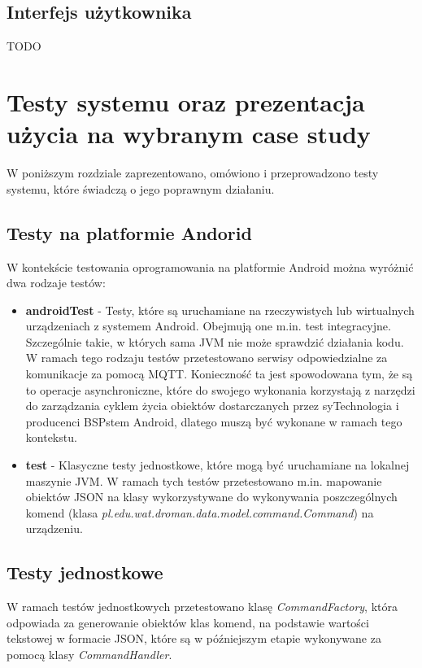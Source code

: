 \subsection{Interfejs użytkownika}
TODO
  
\newpage
\section{Testy systemu oraz prezentacja użycia na wybranym case study}
W poniższym rozdziale zaprezentowano, omówiono i przeprowadzono testy systemu, które świadczą o jego poprawnym działaniu.

\subsection{Testy na platformie Andorid}

W kontekście testowania oprogramowania na platformie Android można wyróżnić dwa
rodzaje testów:
\begin{itemize} 
  \item \textbf{androidTest} - Testy, które są uruchamiane na rzeczywistych lub wirtualnych urządzeniach z systemem Android. Obejmują one m.in. test integracyjne. Szczególnie takie, w których sama JVM nie może sprawdzić działania kodu. W ramach tego rodzaju testów przetestowano serwisy odpowiedzialne za komunikacje za pomocą MQTT. Konieczność ta jest spowodowana tym, że są to operacje asynchroniczne, które do swojego wykonania korzystają z narzędzi do zarządzania cyklem życia obiektów dostarczanych przez syTechnologia i producenci BSPstem Android, dlatego muszą być wykonane w ramach tego kontekstu.
  \item \textbf{test} - Klasyczne testy jednostkowe, które mogą być uruchamiane na lokalnej maszynie JVM. W ramach tych testów przetestowano m.in. mapowanie obiektów JSON na klasy wykorzystywane do wykonywania poszczególnych komend (klasa \textit{pl.edu.wat.droman.data.model.command.Command}) na urządzeniu.
\end{itemize}

\newpage
\subsection{Testy jednostkowe}
W ramach testów jednostkowych przetestowano klasę \textit{CommandFactory}, która odpowiada za generowanie obiektów klas komend, na podstawie wartości tekstowej w formacie JSON, które są w późniejszym etapie wykonywane za pomocą klasy \textit{CommandHandler}.

